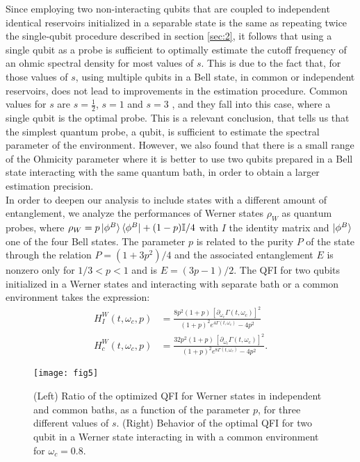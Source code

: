 \documentclass[ pra,a4paper,aps,twocolumn,superscriptaddress]{revtex4-1}
\def\bra#1{\mathinner{\langle{#1}|}}
\def\ket#1{\mathinner{|{#1}\rangle}}
\def\tc#1{{\color{black}#1}}
\newcommand{\ketbra}[2]{\ket{#1}\bra{#2}}
\begin{document}
%
Since employing two non-interacting qubits that are coupled to independent identical reservoirs  initialized in a separable state is the same as repeating twice the single-qubit procedure described in section \ref{sec:2}, it follows that 
\tc{using a single qubit as a probe is sufficient to optimally 
estimate the cutoff frequency of an ohmic spectral density for most values of $s$.
This is due to the fact that, for those values of $s$, using multiple qubits in a Bell state, in common or independent reservoirs, does not lead to improvements in the estimation procedure. Common values for $s$  are $s=\frac12$, $s=1$ and $s=3$ \cite{paavola}, and they fall into this case, where a single qubit is the optimal probe.
This is a relevant conclusion, that tells us that the simplest quantum probe, 
a qubit, is sufficient to estimate the spectral parameter of the environment. However, we also found that there is a small range of  the Ohmicity parameter where it is better to use two qubits prepared in a Bell state interacting with the same quantum bath, in order to obtain a larger estimation precision.}
%
\\
\tc{
In order to deepen our analysis to include states with a different amount of entanglement, we analyze 
the performances of Werner states $\rho_W$ as quantum probes, 
where $\rho_W=p\ketbra{\phi^B}{\phi^B}+(1-p)\mathbb{I}/4$ with  $I$  the identity 
matrix and $\ket{\phi^B}$ one of the four Bell states. The parameter $p$ is related to the purity $P$
of the state through the relation $P=(1+3p^2)/4$ and the associated entanglement $E$ is nonzero only for 
$1/3<p<1$ and is $E=(3p-1)/2$. The QFI for two qubits initialized in a Werner states and interacting with separate bath or a common environment takes the expression:
\begin{align}
H_I^W(t,\omega_c,p)&=\frac{8p^2(1+p)\,[\partial_{\omega_c}\Gamma(t,\omega_c)]^2}{(1+p)^2e^{4\Gamma(t,\omega_c)}-4p^2}\\
H_c^W(t,\omega_c,p)&=\frac{32p^2(1+p)\,[\partial_{\omega_c}\Gamma(t,\omega_c)]^2}{(1+p)^2e^{8\Gamma(t,\omega_c)}-4p^2}.
\end{align}
}
\begin{figure}[t]
 \centering
  \texttt{[image: fig5]}
 \caption{\tc{(Left) Ratio of the optimized QFI for Werner states in independent and common baths, as a function of the parameter $p$, for three different values of $s$. (Right) Behavior of
 the optimal QFI for two qubit in a Werner state interacting in with a common environment for $\omega_c=0.8$. }}
  \label{fig5}
  \noindent
 \end{figure}
\end{document}
